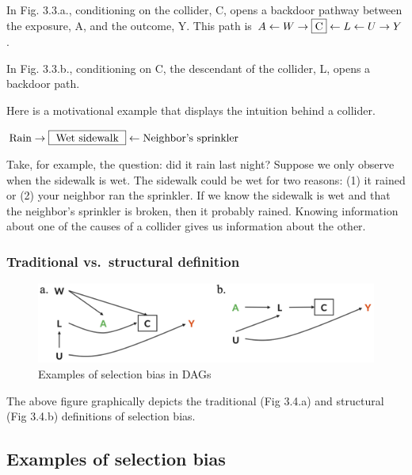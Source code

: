 \documentclass[
]{book}
\begin{document}
In Fig. 3.3.a., conditioning on the collider, C, opens a backdoor pathway between the exposure, A, and the outcome, Y. This path is \(A \leftarrow W \rightarrow \fbox{C} \leftarrow L \leftarrow U \rightarrow Y\).

In Fig. 3.3.b., conditioning on C, the descendant of the collider, L, opens a backdoor path.

Here is a motivational example that displays the intuition behind a collider.

\(\text{Rain} \rightarrow \fbox{ Wet sidewalk } \leftarrow \text{Neighbor's sprinkler}\)

Take, for example, the question: did it rain last night? Suppose we only observe when the sidewalk is wet. The sidewalk could be wet for two reasons: (1) it rained or (2) your neighbor ran the sprinkler. If we know the sidewalk is wet and that the neighbor's sprinkler is broken, then it probably rained. Knowing information about one of the causes of a collider gives us information about the other.

\hypertarget{traditional-vs.-structural-definition}{%
\subsubsection{Traditional vs.~structural definition}\label{traditional-vs.-structural-definition}}

\begin{figure}

{\centering \includegraphics[width=1\linewidth]{img/selection-bias/selection_bias_examples} 

}

\caption{Examples of selection bias in DAGs}\label{fig:unnamed-chunk-22}
\end{figure}

The above figure graphically depicts the traditional (Fig 3.4.a) and structural (Fig 3.4.b) definitions of selection bias.

\hypertarget{examples-of-selection-bias}{%
\subsection{Examples of selection bias}\label{examples-of-selection-bias}}
\end{document}
